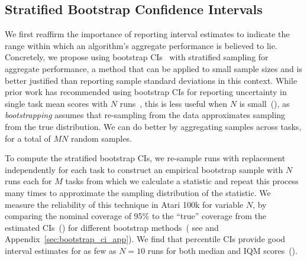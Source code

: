 \vspace{-0.2cm}
\subsection{Stratified Bootstrap Confidence Intervals}
\label{sec:stratified_bootstrap_ci}
\vspace{-0.1cm}
We first reaffirm the importance of reporting interval estimates to indicate the range within which an algorithm's aggregate performance is believed to lie. Concretely, we propose using bootstrap CIs~\citep{eforn1979bootstrap} with stratified sampling for aggregate performance, a method that can be applied to small sample sizes and is better justified than reporting sample standard deviations in this context.
While prior work has recommended using bootstrap CIs for reporting uncertainty in single task mean scores with $N$ runs~\citep{henderson2018deep,chan2019measuring, colas2018many}, this is less useful when $N$ is small~(), as \emph{bootstrapping} assumes that re-sampling from the data approximates sampling from the true distribution. We can do better by aggregating samples across tasks, for a total of $MN$ random samples.



To compute the stratified bootstrap CIs, we re-sample runs with replacement independently for each task to construct an empirical bootstrap sample with $N$ runs each for $M$ tasks from which we calculate a statistic and repeat this process many times to approximate the sampling distribution of the statistic. %
We measure the reliability of this technique in Atari 100k for variable $N$, by comparing the nominal coverage of 95\% to the ``true'' coverage from the estimated CIs~() for different bootstrap methods~(%
see \citep{efron1987better} and Appendix~\ref{sec:bootstrap_ci_app}). We find that percentile CIs provide good interval estimates for as few as $N=10$ runs for both median and IQM scores~().






